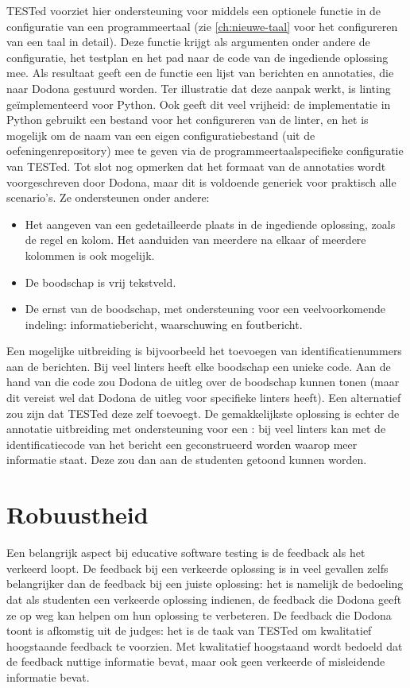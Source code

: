 TESTed voorziet hier ondersteuning voor middels een optionele functie in de configuratie van een programmeertaal (zie \cref{ch:nieuwe-taal} voor het configureren van een taal in detail).
Deze functie krijgt als argumenten onder andere de configuratie, het testplan en het pad naar de code van de ingediende oplossing mee.
Als resultaat geeft een de functie een lijst van berichten en annotaties, die naar Dodona gestuurd worden.
Ter illustratie dat deze aanpak werkt, is linting geïmplementeerd voor Python.
Ook geeft dit veel vrijheid: de implementatie in Python gebruikt een bestand voor het configureren van de linter, en het is mogelijk om de naam van een eigen configuratiebestand (uit de oefeningenrepository) mee te geven via de programmeertaalspecifieke configuratie van TESTed.
Tot slot nog opmerken dat het formaat van de annotaties wordt voorgeschreven door Dodona, maar dit is voldoende generiek voor praktisch alle scenario's.
Ze ondersteunen onder andere:

\begin{itemize}
    \item Het aangeven van een gedetailleerde plaats in de ingediende oplossing, zoals de regel en kolom.
    Het aanduiden van meerdere na elkaar of meerdere kolommen is ook mogelijk.
    \item De boodschap is vrij tekstveld.
    \item De ernst van de boodschap, met ondersteuning voor een veelvoorkomende indeling: informatiebericht, waarschuwing en foutbericht.
\end{itemize}

Een mogelijke uitbreiding is bijvoorbeeld het toevoegen van identificatienummers aan de berichten.
Bij veel linters heeft elke boodschap een unieke code.
Aan de hand van die code zou Dodona de uitleg over de boodschap kunnen tonen (maar dit vereist wel dat Dodona de uitleg voor specifieke linters heeft).
Een alternatief zou zijn dat TESTed deze zelf toevoegt.
De gemakkelijkste oplossing is echter de annotatie uitbreiding met ondersteuning voor een : bij veel linters kan met de identificatiecode van het bericht een  geconstrueerd worden waarop meer informatie staat.
Deze  zou dan aan de studenten getoond kunnen worden.

\section{Robuustheid}\label{sec:robuustheid}

Een belangrijk aspect bij educative software testing is de feedback als het verkeerd loopt.
De feedback bij een verkeerde oplossing is in veel gevallen zelfs belangrijker dan de feedback bij een juiste oplossing: het is namelijk de bedoeling dat als studenten een verkeerde oplossing indienen, de feedback die Dodona geeft ze op weg kan helpen om hun oplossing te verbeteren.
De feedback die Dodona toont is afkomstig uit de judges: het is de taak van TESTed om kwalitatief hoogstaande feedback te voorzien.
Met kwalitatief hoogstaand wordt bedoeld dat de feedback nuttige informatie bevat, maar ook geen verkeerde of misleidende informatie bevat.

